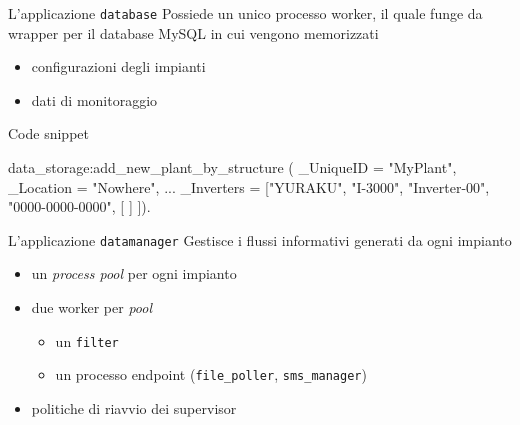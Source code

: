 \documentclass{beamer}
\newcommand{\red}[1]{\textcolor[rgb]{.8,0,0}{#1}}
\newcommand{\green}[1]{\textcolor[rgb]{0,.6,.1}{#1}}
\begin{document}
%
\begin{frame}[fragile]{L'applicazione \texttt{database}}
  Possiede un unico processo \green{worker}, il quale 
  funge da wrapper per il database \red{MySQL} in cui vengono memorizzati
  \begin{itemize}
  \item configurazioni degli impianti
  \item dati di monitoraggio
  \end{itemize}
\begin{exampleblock}{Code snippet}
\begin{semiverbatim}
data_storage:\red{add_new_plant_by_structure} (
      \green{_UniqueID} = "MyPlant", 
      \green{_Location} = "Nowhere",
      ...
      \green{_Inverters} = [{{"YURAKU", "I-3000"}, 
                    "Inverter-00", "0000-0000-0000", 
                    [%
                     ]} ]).
\end{semiverbatim}
\end{exampleblock}  
\end{frame}
%

%
%

%
\begin{frame}{L'applicazione \texttt{datamanager}}
%
Gestisce i flussi informativi generati da ogni impianto
%
\begin{figure}[!h]
  \begin{center}
  \end{center}
\end{figure}
%
\begin{itemize}
\item un \emph{process pool} per ogni impianto
\item due \red{worker} per \emph{pool}
  \begin{itemize}
  \item un \texttt{filter}
  \item un processo \red{endpoint} (\texttt{file\_poller}, \texttt{sms\_manager})
  \end{itemize}
\item politiche di \red{riavvio} dei supervisor
\end{itemize}
%
\end{frame}
%
\end{document}
